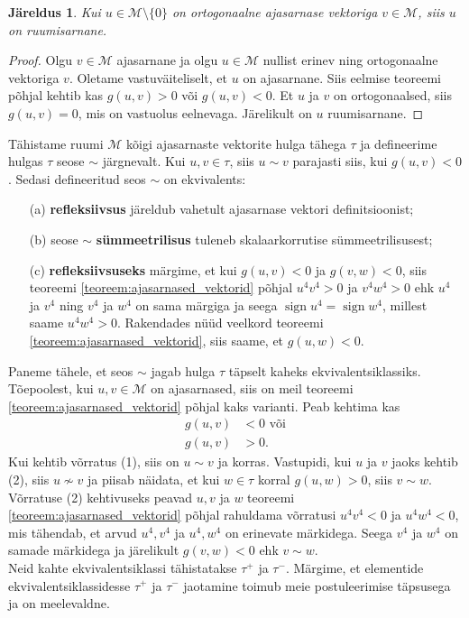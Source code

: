 \documentclass[a4paper,12pt]{article}
\theoremstyle{plain}
\newtheorem{jareldus}{Järeldus}[section]
\theoremstyle{definition}
\numberwithin{equation}{section}
\DeclareMathOperator{\sign}{sign}
\begin{document}
\begin{jareldus}
Kui $u \in \mathcal{M} \setminus \{0\}$ on ortogonaalne ajasarnase vektoriga $v \in \mathcal{M}$, siis $u$ on ruumisarnane.
\end{jareldus}
\begin{proof}
Olgu $v \in \mathcal{M}$ ajasarnane ja olgu $u \in \mathcal{M}$ nullist erinev ning ortogonaalne vektoriga $v$. Oletame vastuväiteliselt, et $u$ on ajasarnane. Siis eelmise teoreemi põhjal kehtib kas $g\left(u,v\right) > 0$ või $g\left(u,v\right) < 0$. Et $u$ ja $v$ on ortogonaalsed, siis $g\left(u,v\right) = 0$, mis on vastuolus eelnevaga. Järelikult on $u$ ruumisarnane.
\end{proof}

Tähistame ruumi $\mathcal{M}$ kõigi ajasarnaste vektorite hulga tähega $\tau$ ja defineerime hulgas $\tau$ seose $\sim$ järgnevalt. Kui $u,v \in \tau$, siis $u \sim v$ parajasti siis, kui $g\left(u,v\right) < 0$. Sedasi defineeritud seos $\sim$ on ekvivalents:
\begin{itemize}
\item[(a)] \textbf{refleksiivsus} järeldub vahetult ajasarnase vektori definitsioonist;
\item[(b)] seose $\sim$ \textbf{sümmeetrilisus} tuleneb skalaarkorrutise sümmeetrilisusest;
\item[(c)] \textbf{refleksiivsuseks} märgime, et kui $g\left(u,v\right) < 0$ ja $g\left(v, w\right) < 0$, siis teoreemi \ref{teoreem:ajasarnased_vektorid} põhjal $u^4 v^4 > 0$ ja $v^4 w^4 > 0$ ehk $u^4$ ja $v^4$ ning $v^4$ ja $w^4$ on sama märgiga ja seega $\sign u^4 = \sign w^4$, millest saame $u^4 w^4 > 0$. Rakendades nüüd veelkord teoreemi \ref{teoreem:ajasarnased_vektorid}, siis saame, et $g\left(u, w\right) < 0$.
\end{itemize}
Paneme tähele, et seos $\sim$ jagab hulga $\tau$ täpselt kaheks ekvivalentsiklassiks. Tõe\-poolest,
kui $u, v \in \mathcal{M}$ on ajasarnased, siis on meil teoreemi \ref{teoreem:ajasarnased_vektorid} põhjal kaks varianti. Peab kehtima kas 
\begin{align}
g\left(u,v\right) &< 0 \text{ või} \tag{1} \\
g\left(u,v\right) &> 0. \tag{2}
\end{align}
Kui kehtib võrratus (1), siis on $u \sim v$ ja korras. Vastupidi, kui $u$ ja $v$ jaoks kehtib (2), siis $u \nsim v$ ja piisab näidata, et kui $w \in \tau$ korral $g\left(u,w\right) > 0$, siis $v \sim w$. Võrratuse (2) kehtivuseks peavad $u, v$ ja $w$ teoreemi \ref{teoreem:ajasarnased_vektorid} põhjal rahuldama võrratusi $u^4 v^4 < 0$ ja $u^4 w^4 < 0$, mis tähendab, et arvud $u^4, v^4$ ja $u^4, w^4$ on erinevate märkidega. Seega $v^4$ ja $w^4$ on samade märkidega ja järelikult $g\left(v,w\right) < 0$ ehk $v \sim w$. \\
Neid kahte ekvivalentsiklassi tähistatakse $\tau^+$ ja $\tau^-$. Märgime, et elementide ekvivalentsiklassidesse $\tau^+$ ja $\tau^-$ jaotamine toimub meie postuleerimise täpsusega ja on meelevaldne.
\end{document}
